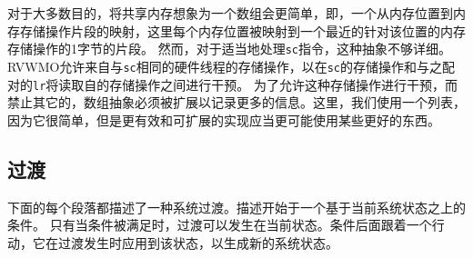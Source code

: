 \begin{commentary}
  对于大多数目的，将共享内存想象为一个数组会更简单，即，一个从内存位置到内存存储操作片段的映射，这里每个内存位置被映射到一个最近的针对该位置的内存存储操作的1字节的片段。
  然而，对于适当地处理{\tt sc}指令，这种抽象不够详细。RVWMO允许来自与{\tt sc}相同的硬件线程的存储操作，以在{\tt sc}的存储操作和与之配对的{\tt lr}将读取自的存储操作之间进行干预。
  为了允许这种存储操作进行干预，而禁止其它的，数组抽象必须被扩展以记录更多的信息。这里，我们使用一个列表，因为它很简单，但是更有效和可扩展的实现应当更可能使用某些更好的东西。
\end{commentary}


\subsection{过渡}\label{sec:omm:transitions}

下面的每个段落都描述了一种系统过渡。描述开始于一个基于当前系统状态之上的条件。
只有当条件被满足时，过渡可以发生在当前状态。条件后面跟着一个行动，它在过渡发生时应用到该状态，以生成新的系统状态。

